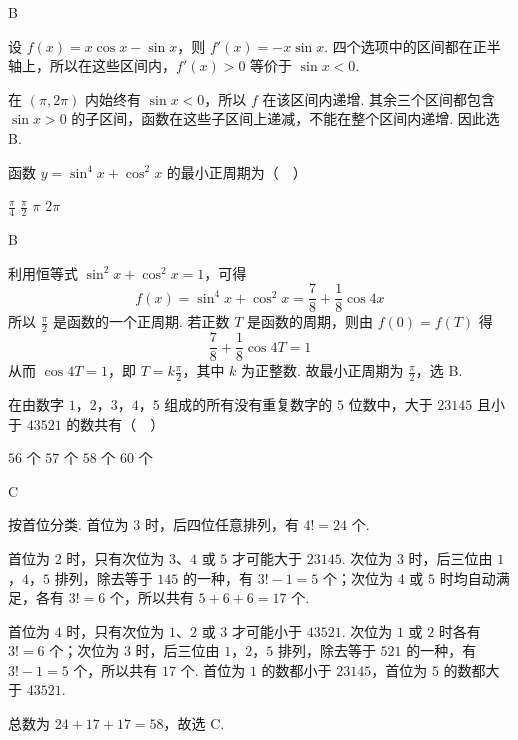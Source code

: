 \begin{answer}
B
\end{answer}

\begin{solution}
设 \(f(x)=x\cos x-\sin x\)，则 \(f'(x)=-x\sin x\). 四个选项中的区间都在正半轴上，所以在这些区间内，\(f'(x)>0\) 等价于 \(\sin x<0\).

在 \((\pi,2\pi)\) 内始终有 \(\sin x<0\)，所以 \(f\) 在该区间内递增. 其余三个区间都包含 \(\sin x>0\) 的子区间，函数在这些子区间上递减，不能在整个区间内递增. 因此选 B.
\end{solution}

\begin{problem}
函数 \( y = \sin^4 x + \cos^2 x \) 的最小正周期为（\(\quad\)）

\choices
    {\( \frac{\pi}{4} \)}
    {\( \frac{\pi}{2} \)}
    {\(\pi\)}
    {\(2\pi\)}
\end{problem}

\begin{answer}
B
\end{answer}

\begin{solution}
利用恒等式 \(\sin^2x+\cos^2x=1\)，可得
\[
f(x)=\sin^4x+\cos^2x=\frac78+\frac18\cos4x
\]
所以 \(\frac\pi2\) 是函数的一个正周期. 若正数 \(T\) 是函数的周期，则由 \(f(0)=f(T)\) 得
\[
\frac78+\frac18\cos4T=1
\]
从而 \(\cos4T=1\)，即 \(T=k\frac\pi2\)，其中 \(k\) 为正整数. 故最小正周期为 \(\frac\pi2\)，选 B.
\end{solution}

\begin{problem}
在由数字 \(1\)，\(2\)，\(3\)，\(4\)，\(5\) 组成的所有没有重复数字的 \(5\) 位数中，大于 \(23145\) 且小于 \(43521\) 的数共有（\(\quad\)）

\choices
    {\(56\text{ 个}\)}
    {\(57\text{ 个}\)}
    {\(58\text{ 个}\)}
    {\(60\text{ 个}\)}
\end{problem}

\begin{answer}
C
\end{answer}

\begin{solution}
按首位分类. 首位为 \(3\) 时，后四位任意排列，有 \(4!=24\) 个.

首位为 \(2\) 时，只有次位为 \(3\)、\(4\) 或 \(5\) 才可能大于 \(23145\). 次位为 \(3\) 时，后三位由 \(1\)，\(4\)，\(5\) 排列，除去等于 \(145\) 的一种，有 \(3!-1=5\) 个；次位为 \(4\) 或 \(5\) 时均自动满足，各有 \(3!=6\) 个，所以共有 \(5+6+6=17\) 个.

首位为 \(4\) 时，只有次位为 \(1\)、\(2\) 或 \(3\) 才可能小于 \(43521\). 次位为 \(1\) 或 \(2\) 时各有 \(3!=6\) 个；次位为 \(3\) 时，后三位由 \(1\)，\(2\)，\(5\) 排列，除去等于 \(521\) 的一种，有 \(3!-1=5\) 个，所以共有 \(17\) 个. 首位为 \(1\) 的数都小于 \(23145\)，首位为 \(5\) 的数都大于 \(43521\).

总数为 \(24+17+17=58\)，故选 C.
\end{solution}

